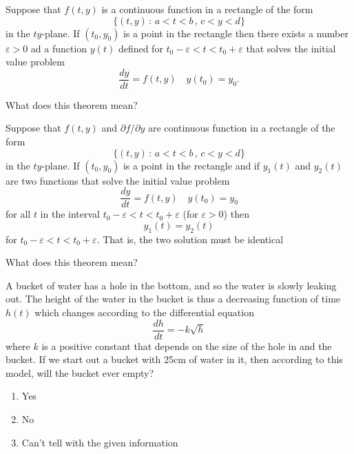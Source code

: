 \begin{thm}
    Suppose that $f(t,y)$ is a continuous function in a rectangle of the form
    \[ \{ (t,y) \, : \, a < t < b \, , \, c < y < d \} \]
    in the $ty$-plane.  If $(t_0,y_0)$ is a point in the rectangle then there exists a
    number $\varepsilon > 0$ ad a function $y(t)$ defined for $t_0 - \varepsilon < t < t_0
    + \varepsilon$ that solves the initial value problem
    \[ \frac{dy}{dt} = f(t,y) \quad y(t_0) = y_0 . \]
\end{thm}
\begin{problem}
    What does this theorem mean?
\end{problem}


\begin{thm}
    Suppose that $f(t,y)$ and $\partial f/\partial y$ are continuous function in a
    rectangle of  the form 
    \[ \{ (t,y) \, : \, a < t < b \, , \, c < y < d \} \]
    in the $ty$-plane.  If $(t_0,y_0)$ is a point in the rectangle and if $y_1(t)$ and
    $y_2(t)$ are two functions that solve the initial value problem 
    \[ \frac{dy}{dt} = f(t,y) \quad y(t_0) = y_0  \]
    for all $t$ in the interval $t_0 - \varepsilon < t < t_0 + \varepsilon$ (for
    $\varepsilon >0$) then
    \[ y_1(t) = y_2(t) \]
    for $t_0 - \varepsilon < t < t_0 + \varepsilon$.  That is, the two solution must be
    identical
\end{thm}
\begin{problem}
    What does this theorem mean?
\end{problem}


\begin{problem}
    A bucket of water has a hole in the bottom, and so the water is slowly leaking out.
    The height of the water in the bucket is thus a decreasing function of time $h(t)$
    which changes according to the differential equation 
    \[ \frac{dh}{dt} = -k\sqrt{h} \]
    where $k$ is a positive constant that depends on the size of the hole in and the
    bucket.  If we start out a bucket with 25cm of water in it, then according to this
    model, will the bucket ever empty?
    \begin{enumerate}
        \item Yes
        \item No
        \item Can't tell with the given information
    \end{enumerate}
\end{problem}



